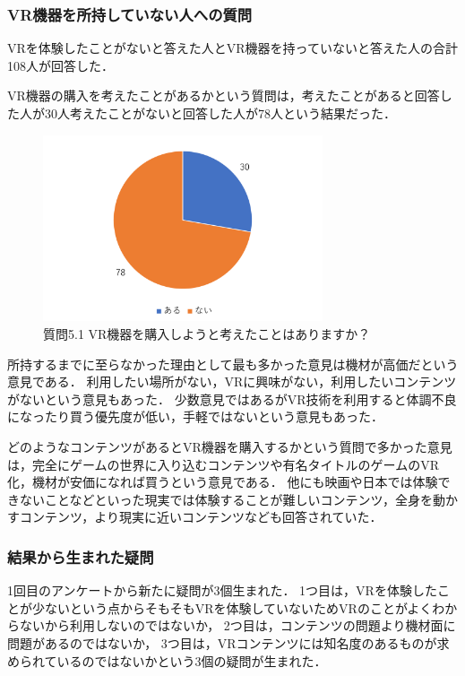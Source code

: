 \documentclass[12pt,a4j]{ltjsarticle}
\begin{document}
\subsubsection{VR機器を所持していない人への質問}
VRを体験したことがないと答えた人とVR機器を持っていないと答えた人の合計108人が回答した．

VR機器の購入を考えたことがあるかという質問は，考えたことがあると回答した人が30人考えたことがないと回答した人が78人という結果だった．

\begin{figure}[h]
\begin{center}
 \includegraphics[clip,height=55mm]{アンケート結果1_5_1.pdf}
\end{center}
 \caption{質問5.1 VR機器を購入しようと考えたことはありますか？}
 \label{fig:アンケート結果1_5_1.pdf}
\end{figure}

所持するまでに至らなかった理由として最も多かった意見は機材が高価だという意見である．
利用したい場所がない，VRに興味がない，利用したいコンテンツがないという意見もあった．
少数意見ではあるがVR技術を利用すると体調不良になったり買う優先度が低い，手軽ではないという意見もあった．

どのようなコンテンツがあるとVR機器を購入するかという質問で多かった意見は，完全にゲームの世界に入り込むコンテンツや有名タイトルのゲームのVR化，機材が安価になれば買うという意見である．
他にも映画や日本では体験できないことなどといった現実では体験することが難しいコンテンツ，全身を動かすコンテンツ，より現実に近いコンテンツなども回答されていた．

\subsubsection{結果から生まれた疑問}
1回目のアンケートから新たに疑問が3個生まれた．
1つ目は，VRを体験したことが少ないという点からそもそもVRを体験していないためVRのことがよくわからないから利用しないのではないか，
2つ目は，コンテンツの問題より機材面に問題があるのではないか，
3つ目は，VRコンテンツには知名度のあるものが求められているのではないかという3個の疑問が生まれた．
\end{document}
